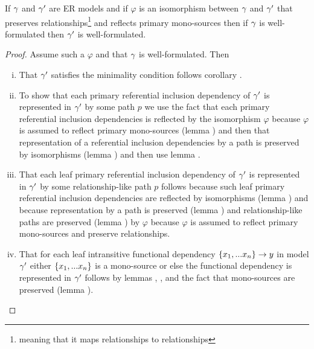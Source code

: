 \begin{lemma}
If $\gamma$ and $\gamma'$ are ER models and  if  $\varphi$ is an isomorphism between $\gamma$  and $\gamma'$ that preserves relationships\footnote{meaning that it maps relationships to relationships} and reflects primary mono-sources then if $\gamma$ is well-formulated then $\gamma'$ is well-formulated.
\end{lemma}
\begin{proof}
Assume such a $\varphi$ and that $\gamma$ is well-formulated. Then
\begin{enumerate} [(i)]
\item{
That $\gamma'$ satisfies the minimality condition follows corollary .
}
\item{ 
To show that each primary referential inclusion dependency of $\gamma'$ is represented in $\gamma'$ by some path $p$ we use the fact that each primary referential inclusion dependencies is reflected
by the isomorphism $\varphi$ because $\varphi$ is assumed to reflect primary mono-sources (lemma ) and then that representation of a referential inclusion dependencies by a path is  preserved by isomorphisms (lemma )
and then use lemma .
}
\item{ 
That each leaf primary referential inclusion dependency of $\gamma'$ is represented in $\gamma'$ by some relationship-like path $p$
follows because such leaf primary referential inclusion dependencies are reflected by isomorphisms
(lemma )
 and because  representation by a path is preserved (lemma ) and relationship-like paths are preserved
(lemma ) 
by $\varphi$  because $\varphi$ is assumed to reflect primary mono-sources and preserve relationships.

}
\item{
That for each leaf intransitive functional dependency $\left\{x_1,...x_n\right\} \rightarrow y$ in model $\gamma'$
either $\left\{x_1,...x_n\right\}$ is a mono-source 
or else the functional dependency is represented in $\gamma'$ 
follows by lemmas , ,
 and the fact that mono-sources are preserved (lemma ).
}
\end{enumerate}
\end{proof}

